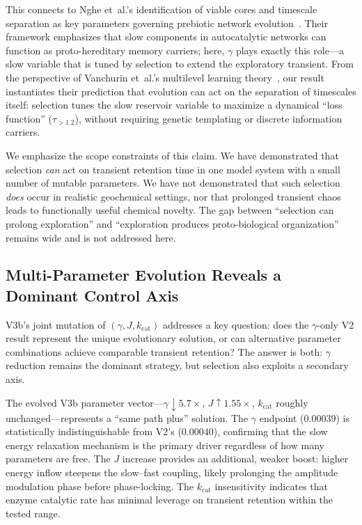 \documentclass[twocolumn,showpacs,preprintnumbers,amsmath,amssymb,prd,floatfix]{revtex4-2}
\newcommand{\tauexp}{\tau_{>1.2}}
\newcommand{\kcat}{k_{\mathrm{cat}}}
\begin{document}
This connects to Nghe et~al.'s identification of viable cores and timescale separation as key parameters governing prebiotic network evolution~\cite{nghe2015}. Their framework emphasizes that slow components in autocatalytic networks can function as proto-hereditary memory carriers; here, $\gamma$ plays exactly this role---a slow variable that is tuned by selection to extend the exploratory transient. From the perspective of Vanchurin et~al.'s multilevel learning theory~\cite{vanchurin2022}, our result instantiates their prediction that evolution can act on the separation of timescales itself: selection tunes the slow reservoir variable to maximize a dynamical ``loss function'' ($\tauexp$), without requiring genetic templating or discrete information carriers.

We emphasize the scope constraints of this claim. We have demonstrated that selection \textit{can} act on transient retention time in one model system with a small number of mutable parameters. We have not demonstrated that such selection \textit{does} occur in realistic geochemical settings, nor that prolonged transient chaos leads to functionally useful chemical novelty. The gap between ``selection can prolong exploration'' and ``exploration produces proto-biological organization'' remains wide and is not addressed here.

\subsection{Multi-Parameter Evolution Reveals a Dominant Control Axis}

V3b's joint mutation of $(\gamma, J, \kcat)$ addresses a key question: does the $\gamma$-only V2 result represent the unique evolutionary solution, or can alternative parameter combinations achieve comparable transient retention? The answer is both: $\gamma$ reduction remains the dominant strategy, but selection also exploits a secondary axis.

The evolved V3b parameter vector---$\gamma \downarrow 5.7\times$, $J \uparrow 1.55\times$, $\kcat$ roughly unchanged---represents a ``same path plus'' solution. The $\gamma$ endpoint ($0.00039$) is statistically indistinguishable from V2's ($0.00040$), confirming that the slow energy relaxation mechanism is the primary driver regardless of how many parameters are free. The $J$ increase provides an additional, weaker boost: higher energy inflow steepens the slow--fast coupling, likely prolonging the amplitude modulation phase before phase-locking. The $\kcat$ insensitivity indicates that enzyme catalytic rate has minimal leverage on transient retention within the tested range.
\end{document}
